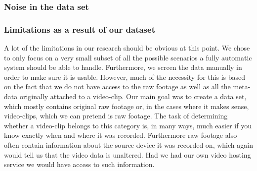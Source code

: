 \subsubsection{Noise in the data set}
%
%
\subsubsection{Limitations as a result of our dataset}
%
A lot of the limitations in our research should be obvious at this point. We chose to only focus on a very small subset of all the possible scenarios a fully automatic system should be able to handle. Furthermore, we screen the data manually in order to make sure it is usable. However, much of the necessity for this is based on the fact that we do not have access to the raw footage as well as all the meta-data originally attached to a video-clip. Our main goal was to create a data set, which mostly contains original raw footage or, in the cases where it makes sense, video-clips, which we can pretend is raw footage. The task of determining whether a video-clip belongs to this category is, in many ways, much easier if you know exactly when and where it was recorded. Furthermore raw footage also often contain information about the source device it was recorded on, which again would tell us that the video data is unaltered. Had we had our own video hosting service we would have access to such information.
%